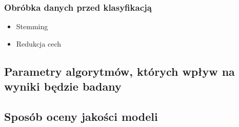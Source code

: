\documentclass[a4paper, 10pt]{article}
\begin{document}
\subsubsection{Obróbka danych przed klasyfikacją}

\begin{itemize}
\item{Stemming}
\item{Redukcja cech}
\end{itemize}


\subsection{Parametry algorytmów, których wpływ na wyniki będzie badany}
\subsection{Sposób oceny jakości modeli}

\nocite{*}

\end{document}
